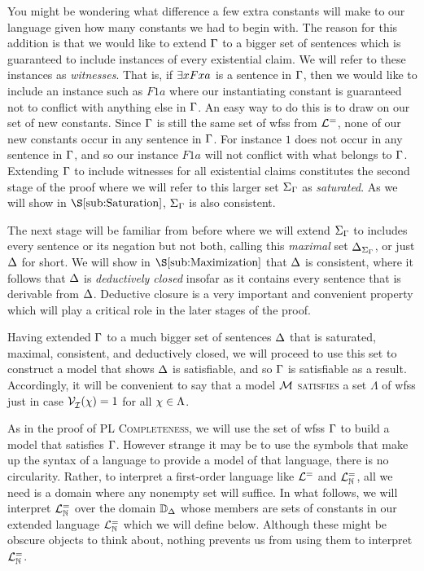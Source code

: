 You might be wondering what difference a few extra constants will make to our language given how many constants we had to begin with.
The reason for this addition is that we would like to extend $\Gamma$ to a bigger set of sentences which is guaranteed to include instances of every existential claim. 
We will refer to these instances as \textit{witnesses}.
That is, if $\exists xFxa$ is a sentence in $\Gamma$, then we would like to include an instance such as $F1a$ where our instantiating constant is guaranteed not to conflict with anything else in $\Gamma$.
An easy way to do this is to draw on our set of new constants.
Since $\Gamma$ is still the same set of wfss from $\mathcal{L}^{=}$, none of our new constants occur in any sentence in $\Gamma$.
For instance $1$ does not occur in any sentence in $\Gamma$, and so our instance $F1a$ will not conflict with what belongs to $\Gamma$. 
Extending $\Gamma$ to include witnesses for all existential claims constitutes the second stage of the proof where we will refer to this larger set $\Sigma_{\Gamma}$ as \textit{saturated}. 
As we will show in $\S\ref{sub:Saturation}$, $\Sigma_{\Gamma}$ is also consistent. 

The next stage will be familiar from before where we will extend $\Sigma_{\Gamma}$ to includes every sentence or its negation but not both, calling this \textit{maximal} set $\Delta_{\Sigma_{\Gamma}}$, or just $\Delta$ for short. 
We will show in $\S\ref{sub:Maximization}$ that $\Delta$ is consistent, where it follows that $\Delta$ is \textit{deductively closed} insofar as it contains every sentence that is derivable from $\Delta$.
Deductive closure is a very important and convenient property which will play a critical role in the later stages of the proof.

Having extended $\Gamma$ to a much bigger set of sentences $\Delta$ that is saturated, maximal, consistent, and deductively closed, we will proceed to use this set to construct a model that shows $\Delta$ is satisfiable, and so $\Gamma$ is satisfiable as a result. 
Accordingly, it will be convenient to say that a model $\mathcal{M}$ \textsc{satisfies} a set $\Lambda$ of wfss just in case $\mathcal{V}_{\mathcal{I}}^{}(\chi) = 1$ for all $\chi \in \Lambda$. 

As in the proof of \textsc{PL Completeness}, we will use the set of wfss $\Gamma$ to build a model that satisfies $\Gamma$.
However strange it may be to use the symbols that make up the syntax of a language to provide a model of that language, there is no circularity.
Rather, to interpret a first-order language like $\mathcal{L}^{=}$ and $\mathcal{L}^{=}_{\mathbb{N}}$, all we need is a domain where any nonempty set will suffice.
In what follows, we will interpret $\mathcal{L}^{=}_{\mathbb{N}}$ over the domain $\mathbb{D}_{\Delta}$ whose members are sets of constants in our extended language $\mathcal{L}^{=}_{\mathbb{N}}$ which we will define below.
Although these might be obscure objects to think about, nothing prevents us from using them to interpret $\mathcal{L}^{=}_{\mathbb{N}}$.


